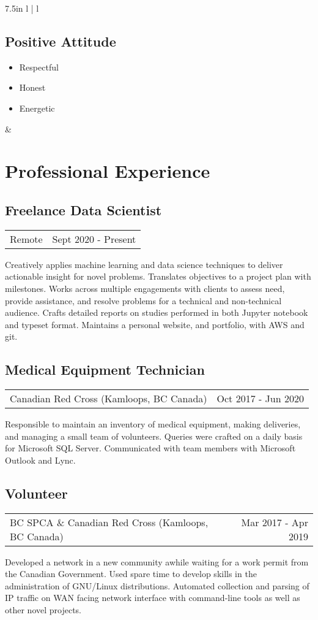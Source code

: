 \documentclass{article}
\begin{document}
\begin{tabular*}{7.5in}{ l | l}
\begin{minipage}[t]{2.0in}
	\subsection*{Positive Attitude}
	\begin{itemize}[noitemsep]
		\item Respectful
		\item Honest
		\item Energetic
	\end{itemize}
	\smallskip
	\end{minipage} &
	
	\begin{minipage}[t]{5.25in}
	\section*{Professional Experience}
	\subsection*{Freelance Data Scientist}
	\begin{tabular*}{\columnwidth}{@{\extracolsep{\fill}}lr}
	Remote & Sept 2020 - Present
	\end{tabular*}
	Creatively applies machine learning and data science techniques to deliver actionable insight for novel problems.
	Translates objectives to a project plan with milestones.
	Works across multiple engagements with clients to assess need, provide assistance, and resolve problems for a technical and non-technical audience.
	Crafts detailed reports on studies performed in both Jupyter notebook and typeset format.
	Maintains a personal website, and portfolio, with AWS and git.
	\medskip
	\subsection*{Medical Equipment Technician}
	\begin{tabular*}{\columnwidth}{@{\extracolsep{\fill}}lr}
		Canadian Red Cross (Kamloops, BC Canada) & Oct 2017 - Jun 2020
	\end{tabular*}
	Responsible to maintain an inventory of medical equipment, making deliveries, and managing a small team of volunteers.
	Queries were crafted on a daily basis for Microsoft SQL Server.
	Communicated with team members with Microsoft Outlook and Lync.
	\medskip
	\subsection*{Volunteer}
	\begin{tabular*}{\columnwidth}{@{\extracolsep{\fill}}lr}
		BC SPCA \& Canadian Red Cross (Kamloops, BC Canada)& Mar 2017 - Apr 2019
	\end{tabular*}
	Developed a network in a new community awhile waiting for a work permit from the Canadian Government.
	Used spare time to develop skills in the administration of GNU/Linux distributions.
	Automated collection and parsing of IP traffic on WAN facing network interface with command-line tools as well as other novel projects.
	\medskip

\end{minipage}
\end{tabular*}
\end{document}
